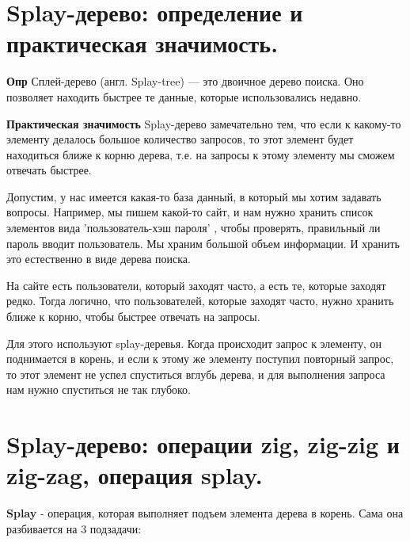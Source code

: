 \section{Splay-дерево: определение и практическая значимость.}

\textbf{Опр} Сплей-дерево (англ. Splay-tree) — это двоичное дерево поиска. Оно позволяет находить быстрее те данные, которые использовались недавно.

\textbf{Практическая значимость } Splay-дерево замечательно тем, что если к какому-то элементу делалось большое количество запросов, то этот элемент будет находиться ближе к корню дерева, т.е. на запросы к этому элементу мы сможем отвечать быстрее.

Допустим, у нас имеется какая-то база данный, в который мы хотим задавать вопросы. Например, мы пишем какой-то сайт, и нам нужно хранить список элементов вида 'пользователь-хэш пароля' , чтобы проверять, правильный ли пароль вводит пользователь. Мы храним большой объем информации. И хранить это естественно в виде дерева поиска.

На сайте есть пользователи, который заходят часто, а есть те, которые заходят редко. Тогда логично, что пользователей, которые заходят часто, нужно хранить ближе к корню, чтобы быстрее отвечать на запросы. 

Для этого используют splay-деревья. Когда происходит запрос к элементу, он поднимается в корень, и если к этому же элементу поступил повторный запрос, то этот элемент не успел спуститься вглубь дерева, и для выполнения запроса нам нужно спуститься не так глубоко.

\section{Splay-дерево: операции zig, zig-zig и zig-zag, операция splay.}

\textbf{Splay } - операция, которая выполняет подъем элемента дерева в корень. Сама она разбивается на 3 подзадачи:

